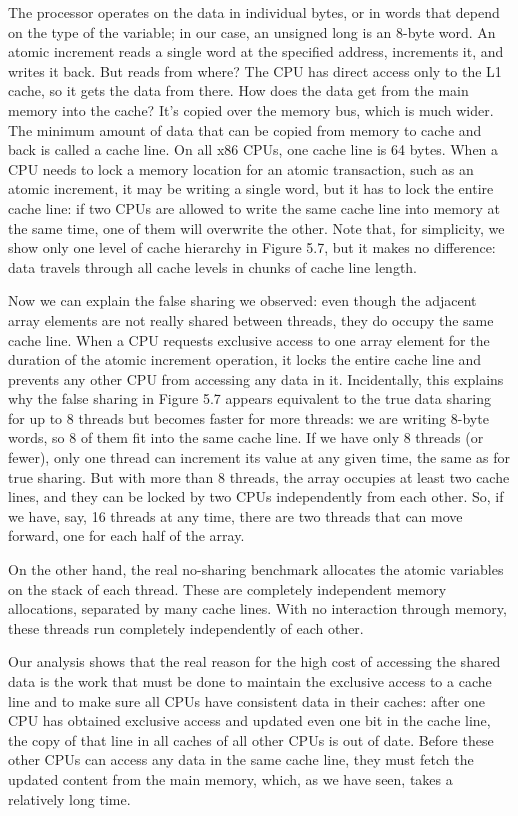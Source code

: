 The processor operates on the data in individual bytes, or in words that depend on the type of the variable; in our case, an unsigned long is an 8-byte word. An atomic increment reads a single word at the specified address, increments it, and writes it back. But reads from where? The CPU has direct access only to the L1 cache, so it gets the data from there. How does the data get from the main memory into the cache? It's copied over the memory bus, which is much wider. The minimum amount of data that can be copied from memory to cache and back is called a cache line. On all x86 CPUs, one cache line is 64 bytes. When a CPU needs to lock a memory location for an atomic transaction, such as an atomic increment, it may be writing a single word, but it has to lock the entire cache line: if two CPUs are allowed to write the same cache line into memory at the same time, one of them will overwrite the other. Note that, for simplicity, we show only one level of cache hierarchy in Figure 5.7, but it makes no difference: data travels through all cache levels in chunks of cache line length.

Now we can explain the false sharing we observed: even though the adjacent array elements are not really shared between threads, they do occupy the same cache line. When a CPU requests exclusive access to one array element for the duration of the atomic increment operation, it locks the entire cache line and prevents any other CPU from accessing any data in it. Incidentally, this explains why the false sharing in Figure 5.7 appears equivalent to the true data sharing for up to 8 threads but becomes faster for more threads: we are writing 8-byte words, so 8 of them fit into the same cache line. If we have only 8 threads (or fewer), only one thread can increment its value at any given time, the same as for true sharing. But with more than 8 threads, the array occupies at least two cache lines, and they can be locked by two CPUs independently from each other. So, if we have, say, 16 threads at any time, there are two threads that can move forward, one for each half of the array.

On the other hand, the real no-sharing benchmark allocates the atomic variables on the stack of each thread. These are completely independent memory allocations, separated by many cache lines. With no interaction through memory, these threads run completely independently of each other.

Our analysis shows that the real reason for the high cost of accessing the shared data is the work that must be done to maintain the exclusive access to a cache line and to make sure all CPUs have consistent data in their caches: after one CPU has obtained exclusive access and updated even one bit in the cache line, the copy of that line in all caches of all other CPUs is out of date. Before these other CPUs can access any data in the same cache line, they must fetch the updated content from the main memory, which, as we have seen, takes a relatively long time.


